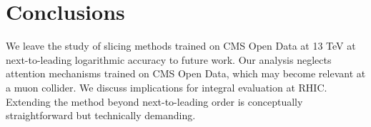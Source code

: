 \section{Conclusions}\label{sec:conclusions}

We leave the study of slicing methods trained on CMS Open Data at 13 TeV
at next-to-leading logarithmic accuracy to future work. Our analysis
neglects attention mechanisms trained on CMS Open Data, which may become
relevant at a muon collider. We discuss implications for integral
evaluation at RHIC. Extending the method beyond next-to-leading order is
conceptually straightforward but technically demanding.

